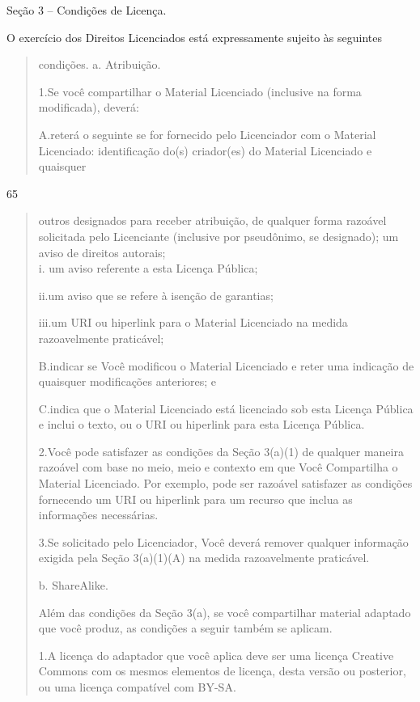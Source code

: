 \documentclass[
]{article}
\begin{document}
Seção 3 -- Condições de Licença.

O exercício dos Direitos Licenciados está expressamente sujeito às
seguintes

\begin{quote}
condições. a. Atribuição.

1.Se você compartilhar o Material Licenciado (inclusive na forma
modificada), deverá:

A.reterá o seguinte se for fornecido pelo Licenciador com o Material
Licenciado: identificação do(s) criador(es) do Material Licenciado e
quaisquer
\end{quote}

65

\begin{quote}
outros designados para receber atribuição, de qualquer forma razoável
solicitada pelo Licenciante (inclusive por pseudônimo, se designado); um
aviso de direitos autorais;\\
i. um aviso referente a esta Licença Pública;

ii.um aviso que se refere à isenção de garantias;

iii.um URI ou hiperlink para o Material Licenciado na medida
razoavelmente praticável;

B.indicar se Você modificou o Material Licenciado e reter uma indicação
de quaisquer modificações anteriores; e

C.indica que o Material Licenciado está licenciado sob esta Licença
Pública e inclui o texto, ou o URI ou hiperlink para esta Licença
Pública.

2.Você pode satisfazer as condições da Seção 3(a)(1) de qualquer maneira
razoável com base no meio, meio e contexto em que Você Compartilha o
Material Licenciado. Por exemplo, pode ser razoável satisfazer as
condições fornecendo um URI ou hiperlink para um recurso que inclua as
informações necessárias.

3.Se solicitado pelo Licenciador, Você deverá remover qualquer
informação exigida pela Seção 3(a)(1)(A) na medida razoavelmente
praticável.

b. ShareAlike.

Além das condições da Seção 3(a), se você compartilhar material adaptado
que você produz, as condições a seguir também se aplicam.

1.A licença do adaptador que você aplica deve ser uma licença Creative
Commons com os mesmos elementos de licença, desta versão ou posterior,
ou uma licença compatível com BY-SA.
\end{quote}
\end{document}
